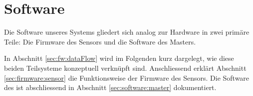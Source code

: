 \chapter{Software}
\label{chap:software}

Die  Software   unseres  Systems   gliedert  sich   analog  zur   Hardware  in
zwei  prim\"are  Teile: Die   Firmware  des  Sensors  und   die  Software  des
Masters.

In  Abschnitt   \ref{sec:fw:dataFlow}  wird   im  Folgenden   kurz  dargelegt,
wie  diese  beiden  Teilsysteme  konzeptuell  verkn\"upft  sind. Anschliessend
erkl\"art Abschnitt \ref{sec:firmware:sensor}  die Funktionsweise der Firmware
des  Sensors. Die   Software  des   \Raspi  ist  abschliessend   in  Abschnitt
\ref{sec:software:master} dokumentiert.


